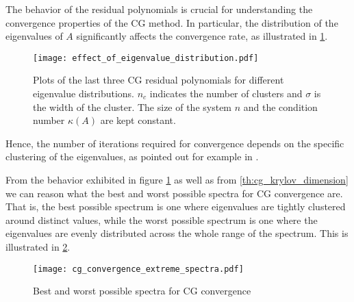 The behavior of the residual polynomials is crucial for understanding the convergence properties of the CG method. In particular, the distribution of the eigenvalues of $A$ significantly affects the convergence rate, as illustrated in \cref{fig:cg_effect_of_eigenvalue_distribution}.
\begin{figure}[H]
  \centering
  \texttt{[image: effect\_of\_eigenvalue\_distribution.pdf]}
  \caption{Plots of the last three CG residual polynomials for different eigenvalue distributions. $n_c$ indicates  the number of clusters and $\sigma$ is the width of the cluster. The size of the system $n$ and the condition number $\kappa(A)$ are kept constant.}
  \label{fig:cg_effect_of_eigenvalue_distribution}
\end{figure}
Hence, the number of iterations required for convergence depends on the specific clustering of the eigenvalues, as pointed out for example in \citeauthor[Section 2.3]{nonlinear_cg_Kelley_1995}.

From the behavior exhibited in figure \cref{fig:cg_effect_of_eigenvalue_distribution} as well as from \cref{th:cg_krylov_dimension} we can reason what the best and worst possible spectra for CG convergence are. That is, the best possible spectrum is one where eigenvalues are tightly clustered around distinct values, while the worst possible spectrum is one where the eigenvalues are evenly distributed across the whole range of the spectrum. This is illustrated in \cref{fig:cg_best_worst_spectra}.
\begin{figure}[H]
  \centering
  \texttt{[image: cg\_convergence\_extreme\_spectra.pdf]}
  \caption{Best and worst possible spectra for CG convergence}
  \label{fig:cg_best_worst_spectra}
\end{figure}


